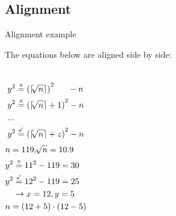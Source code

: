 \subsection{Alignment}
  
\begin{frame}{Alignment example}

  The equations below are aligned side by side:
  
  \begin{columns}
    \begin{align*}
        &y^2 \stackrel{\times}{=}{(\lceil \sqrt[]{n} \rceil)}^2 \hphantom{+1)} -n \\ 
        &y^2 \stackrel{\times}{=}{(\lceil \sqrt[]{n} \rceil+1)}^2 -n \\
        &... \\
        &y^2  \stackrel{\checkmark}{=}{(\lceil \sqrt[]{n} \rceil+z)}^2 -n \\ 
    \end{align*}
    \begin{align*}
        & n = 119,\sqrt[]{n}=10.9 \\
        & y^2 \stackrel{\times}{=}{11}^2 -119 = 30  \\
        & y^2 \stackrel{\checkmark}{=}{12}^2 -119 = 25  \\
        & \hphantom{y^2}\rightarrow x=12, y = 5 \\
        & n=(12+5) \cdot (12-5) \\
    \end{align*}
  \end{columns}

\end{frame}